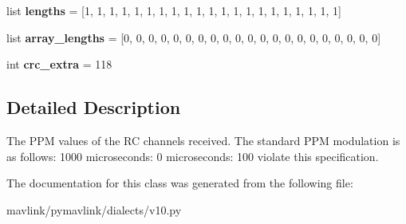 \begin{DoxyCompactItemize}
list {\bfseries lengths} = \mbox{[}1, 1, 1, 1, 1, 1, 1, 1, 1, 1, 1, 1, 1, 1, 1, 1, 1, 1, 1, 1, 1\mbox{]}
\item 
\mbox{\label{classpymavlink_1_1dialects_1_1v10_1_1MAVLink__rc__channels__message_ab67f8217f809bcda014c1fa5d7ba123f}} 
list {\bfseries array\+\_\+lengths} = \mbox{[}0, 0, 0, 0, 0, 0, 0, 0, 0, 0, 0, 0, 0, 0, 0, 0, 0, 0, 0, 0, 0\mbox{]}
\item 
\mbox{\label{classpymavlink_1_1dialects_1_1v10_1_1MAVLink__rc__channels__message_acf2e646eba57a0df6b3982c6b65ecdf8}} 
int {\bfseries crc\+\_\+extra} = 118
\end{DoxyCompactItemize}


\subsection{Detailed Description}
\begin{DoxyVerb}The PPM values of the RC channels received. The standard PPM
modulation is as follows: 1000 microseconds: 0%
microseconds: 100%
violate this specification.
\end{DoxyVerb}
 

The documentation for this class was generated from the following file\+:\begin{DoxyCompactItemize}
\item 
mavlink/pymavlink/dialects/v10.\+py\end{DoxyCompactItemize}
